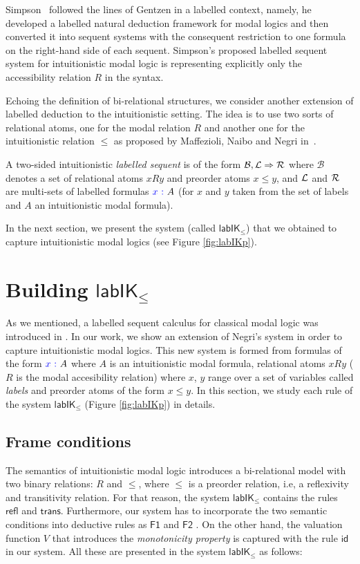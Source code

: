 \documentclass[twoside]{aiml18}
\newcommand{\B}{\mathcal{B}}
\newcommand*{\lab}{\mathsf{lab}}
\newcommand*{\IK}{\mathsf{IK}}
\newcommand*{\labIKp}{\lab\IK_{\le}}
\newcommand*{\labels}[2]{{\color{blue}{#1}\:\colon}{#2}}
\newcommand{\SEQ}{\Rightarrow}
\newcommand*{\rn}[1]  {\ensuremath{\mathsf{#1}}}
\newcommand*{\rel}{R}
\begin{document}
Simpson~\cite{Simpson} followed the lines of Gentzen in a labelled context, namely, he developed a labelled natural deduction framework for modal logics and then converted it into sequent systems with the consequent restriction to one formula on the right-hand side of each sequent. Simpson's proposed labelled sequent system for intuitionistic modal logic is representing explicitly only the accessibility relation $\rel$ in the syntax.
%

Echoing the definition of bi-relational structures, we consider another extension of labelled deduction to the intuitionistic setting. 
%
The idea is to use two sorts of relational atoms, one for the modal relation $\rel$ and another one for the intuitionistic relation $\leq$ as proposed by Maffezioli, Naibo and Negri in~\cite{Maffezioli}. 
%

\begin{definition}
A two-sided intuitionistic \emph{labelled sequent} is of the form $\B, \Left \SEQ \Right$ where $\B$ denotes a set of relational atoms $x \rel y$ and preorder atoms $x \le y$, and $\mathcal{L}$ and $\mathcal{R}$ are multi-sets of labelled formulas $\labels{x}{A}$ (for $x$ and $y$ taken from the set of labels and $A$ an intuitionistic modal formula).
\end{definition}
In the next section, we present the system (called $\labIKp$) that we obtained to capture intuitionistic modal logics (see Figure \ref{fig:labIKp}).

\section{Building $\labIKp$}

As we mentioned, a labelled sequent calculus for classical modal logic was introduced in \cite{Negri}. In our work, we show an extension of Negri's system in order to capture intuitionistic modal logics. This new system is formed from formulas of the form $\labels{x}{A}$ where $A$ is an intuitionistic modal formula, relational atoms $xRy$ ($R$ is the modal accesibility relation) where $x$, $y$ range over a set of variables called \emph{labels} and preorder atoms of the form $x \le y$. In this section, we study each rule of the system $\labIKp$ (Figure \ref{fig:labIKp}) in details. 

\subsection{Frame conditions}
The semantics of intuitionistic modal logic introduces a bi-relational model with two binary relations: $R$ and $\le$, where $\le$ is a preorder relation, i.e, a reflexivity and transitivity relation. For that reason, the system $\labIKp$ contains the rules $\rn{refl}$ and $\rn{trans}$. Furthermore, our system has to incorporate the two semantic conditions into deductive rules as $\rn{F1}$ and $\rn{F2}$ . On the other hand, the valuation function $V$ that introduces the \emph{monotonicity property} is captured with the rule $\rn{id}$ in our system. All these are presented in the system $\labIKp$ as follows:
\end{document}
